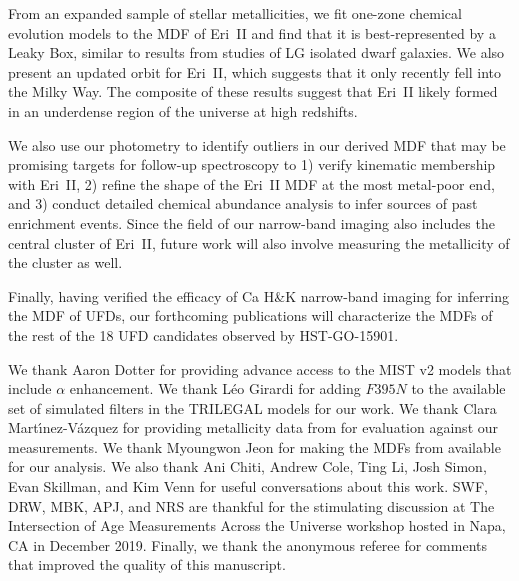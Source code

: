 \documentclass[twocolumn]{aastex63}
\begin{document}
\par From an expanded sample of stellar metallicities, we fit one-zone chemical evolution models to the MDF of Eri~II and find that it is best-represented by a Leaky Box, similar to results from studies of LG isolated dwarf galaxies. We also present an updated orbit for Eri~II, which suggests that it only recently fell into the Milky Way. The composite of these results suggest that Eri~II likely formed in an underdense region of the universe at high redshifts. 

\par We also use our photometry to identify outliers in our derived MDF that may be promising targets for follow-up spectroscopy to 1) verify kinematic membership with Eri~II, 2) refine the shape of the Eri~II MDF at the most metal-poor end, and 3) conduct detailed chemical abundance analysis to infer sources of past enrichment events. Since the field of our narrow-band imaging also includes the central cluster of Eri~II, future work will also involve measuring the metallicity of the cluster as well. 

\par  Finally, having verified the efficacy of Ca H\&K narrow-band imaging for inferring the MDF of UFDs, our forthcoming publications will characterize the MDFs of the rest of the 18 UFD candidates observed by HST-GO-15901. 

\acknowledgements

\par We thank Aaron Dotter for providing advance access to the MIST v2 models that include $\alpha$ enhancement. We thank L\'eo Girardi for adding $F395N$ to the available set of simulated filters in the TRILEGAL models for our work. We thank Clara Mart{\'\i}nez-V{\'a}zquez for providing metallicity data from \citet{martinezvazquez2021} for evaluation against our measurements. We thank Myoungwon Jeon for making the MDFs from \citet{jeon2017popIII} available for our analysis. We also thank Ani Chiti, Andrew Cole, Ting Li, Josh Simon, Evan Skillman, and Kim Venn for useful conversations about this work. SWF, DRW, MBK, APJ, and NRS are thankful for the stimulating discussion at The Intersection of Age Measurements Across the Universe workshop hosted in Napa, CA in December 2019. Finally, we thank the anonymous referee for comments that improved the quality of this manuscript.
\end{document}

